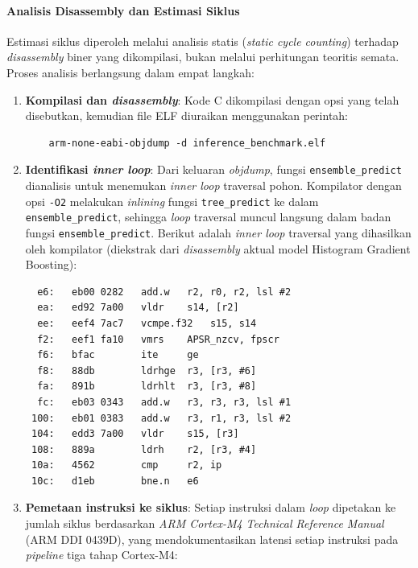 \paragraph{Analisis Disassembly dan Estimasi Siklus}
Estimasi siklus diperoleh melalui analisis statis (\textit{static cycle counting}) terhadap \textit{disassembly} biner yang dikompilasi, bukan melalui perhitungan teoritis semata. Proses analisis berlangsung dalam empat langkah:

\begin{enumerate}
    \item \textbf{Kompilasi dan \textit{disassembly}}: Kode C dikompilasi dengan opsi yang telah disebutkan, kemudian file ELF diuraikan menggunakan perintah:
    \begin{verbatim}
    arm-none-eabi-objdump -d inference_benchmark.elf
    \end{verbatim}

    \item \textbf{Identifikasi \textit{inner loop}}: Dari keluaran \textit{objdump}, fungsi \texttt{ensemble\_predict} dianalisis untuk menemukan \textit{inner loop} traversal pohon. Kompilator dengan opsi \texttt{-O2} melakukan \textit{inlining} fungsi \texttt{tree\_predict} ke dalam \texttt{ensemble\_predict}, sehingga \textit{loop} traversal muncul langsung dalam badan fungsi \texttt{ensemble\_predict}. Berikut adalah \textit{inner loop} traversal yang dihasilkan oleh kompilator (diekstrak dari \textit{disassembly} aktual model Histogram Gradient Boosting):

\begin{verbatim}
  e6:   eb00 0282   add.w   r2, r0, r2, lsl #2
  ea:   ed92 7a00   vldr    s14, [r2]
  ee:   eef4 7ac7   vcmpe.f32   s15, s14
  f2:   eef1 fa10   vmrs    APSR_nzcv, fpscr
  f6:   bfac        ite     ge
  f8:   88db        ldrhge  r3, [r3, #6]
  fa:   891b        ldrhlt  r3, [r3, #8]
  fc:   eb03 0343   add.w   r3, r3, r3, lsl #1
 100:   eb01 0383   add.w   r3, r1, r3, lsl #2
 104:   edd3 7a00   vldr    s15, [r3]
 108:   889a        ldrh    r2, [r3, #4]
 10a:   4562        cmp     r2, ip
 10c:   d1eb        bne.n   e6
\end{verbatim}

    \item \textbf{Pemetaan instruksi ke siklus}: Setiap instruksi dalam \textit{loop} dipetakan ke jumlah siklus berdasarkan \textit{ARM Cortex-M4 Technical Reference Manual} (ARM DDI 0439D), yang mendokumentasikan latensi setiap instruksi pada \textit{pipeline} tiga tahap Cortex-M4:


\end{enumerate}
